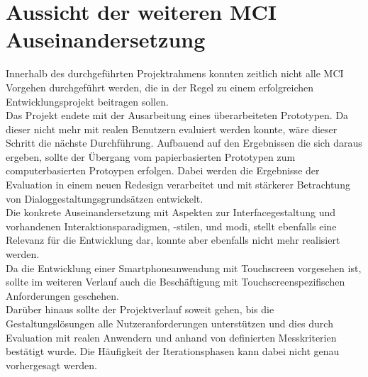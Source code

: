 
\section{Aussicht der weiteren MCI Auseinandersetzung}
Innerhalb des durchgeführten Projektrahmens konnten zeitlich nicht alle MCI Vorgehen durchgeführt werden, die in der Regel zu einem erfolgreichen Entwicklungsprojekt beitragen sollen.\\

Das Projekt endete mit der Ausarbeitung eines überarbeiteten Prototypen. Da dieser nicht mehr mit realen Benutzern evaluiert werden konnte, wäre dieser Schritt die nächste Durchführung. Aufbauend auf den Ergebnissen die sich daraus ergeben, sollte der Übergang vom papierbasierten Prototypen zum computerbasierten Protoypen erfolgen. Dabei werden die Ergebnisse der Evaluation in einem neuen Redesign verarbeitet und mit stärkerer Betrachtung von Dialoggestaltungsgrundsätzen entwickelt.\\
Die konkrete Auseinandersetzung mit Aspekten zur Interfacegestaltung und vorhandenen Interaktionsparadigmen, -stilen, und modi, stellt ebenfalls eine Relevanz für die Entwicklung dar, konnte aber ebenfalls nicht mehr  realisiert werden.\\
Da die Entwicklung einer Smartphoneanwendung mit Touchscreen vorgesehen ist, sollte im weiteren Verlauf auch die Beschäftigung mit Touchscreenspezifischen Anforderungen geschehen.\\

Darüber hinaus sollte der Projektverlauf soweit gehen, bis die Gestaltungslösungen alle Nutzeranforderungen unterstützen und dies durch Evaluation mit realen Anwendern und anhand von definierten Messkriterien bestätigt wurde. 
Die Häufigkeit der Iterationsphasen kann dabei nicht genau vorhergesagt werden. 